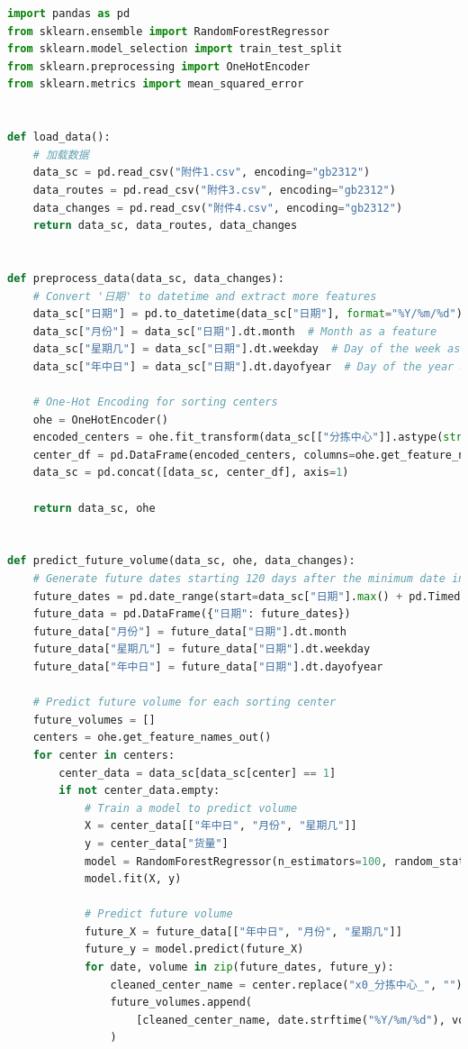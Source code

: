 \documentclass[UTF8]{article}%
\begin{document}
\begin{lstlisting}[language=python]
import pandas as pd
from sklearn.ensemble import RandomForestRegressor
from sklearn.model_selection import train_test_split
from sklearn.preprocessing import OneHotEncoder
from sklearn.metrics import mean_squared_error


def load_data():
    # 加载数据
    data_sc = pd.read_csv("附件1.csv", encoding="gb2312")
    data_routes = pd.read_csv("附件3.csv", encoding="gb2312")
    data_changes = pd.read_csv("附件4.csv", encoding="gb2312")
    return data_sc, data_routes, data_changes


def preprocess_data(data_sc, data_changes):
    # Convert '日期' to datetime and extract more features
    data_sc["日期"] = pd.to_datetime(data_sc["日期"], format="%Y/%m/%d")
    data_sc["月份"] = data_sc["日期"].dt.month  # Month as a feature
    data_sc["星期几"] = data_sc["日期"].dt.weekday  # Day of the week as a feature
    data_sc["年中日"] = data_sc["日期"].dt.dayofyear  # Day of the year as a feature

    # One-Hot Encoding for sorting centers
    ohe = OneHotEncoder()
    encoded_centers = ohe.fit_transform(data_sc[["分拣中心"]].astype(str)).toarray()
    center_df = pd.DataFrame(encoded_centers, columns=ohe.get_feature_names_out())
    data_sc = pd.concat([data_sc, center_df], axis=1)

    return data_sc, ohe


def predict_future_volume(data_sc, ohe, data_changes):
    # Generate future dates starting 120 days after the minimum date in the data
    future_dates = pd.date_range(start=data_sc["日期"].max() + pd.Timedelta(days=1), periods=31, freq="D")
    future_data = pd.DataFrame({"日期": future_dates})
    future_data["月份"] = future_data["日期"].dt.month
    future_data["星期几"] = future_data["日期"].dt.weekday
    future_data["年中日"] = future_data["日期"].dt.dayofyear

    # Predict future volume for each sorting center
    future_volumes = []
    centers = ohe.get_feature_names_out()
    for center in centers:
        center_data = data_sc[data_sc[center] == 1]
        if not center_data.empty:
            # Train a model to predict volume
            X = center_data[["年中日", "月份", "星期几"]]
            y = center_data["货量"]
            model = RandomForestRegressor(n_estimators=100, random_state=42)
            model.fit(X, y)

            # Predict future volume
            future_X = future_data[["年中日", "月份", "星期几"]]
            future_y = model.predict(future_X)
            for date, volume in zip(future_dates, future_y):
                cleaned_center_name = center.replace("x0_分拣中心_", "")
                future_volumes.append(
                    [cleaned_center_name, date.strftime("%Y/%m/%d"), volume]
                )


\end{lstlisting}
\end{document}
